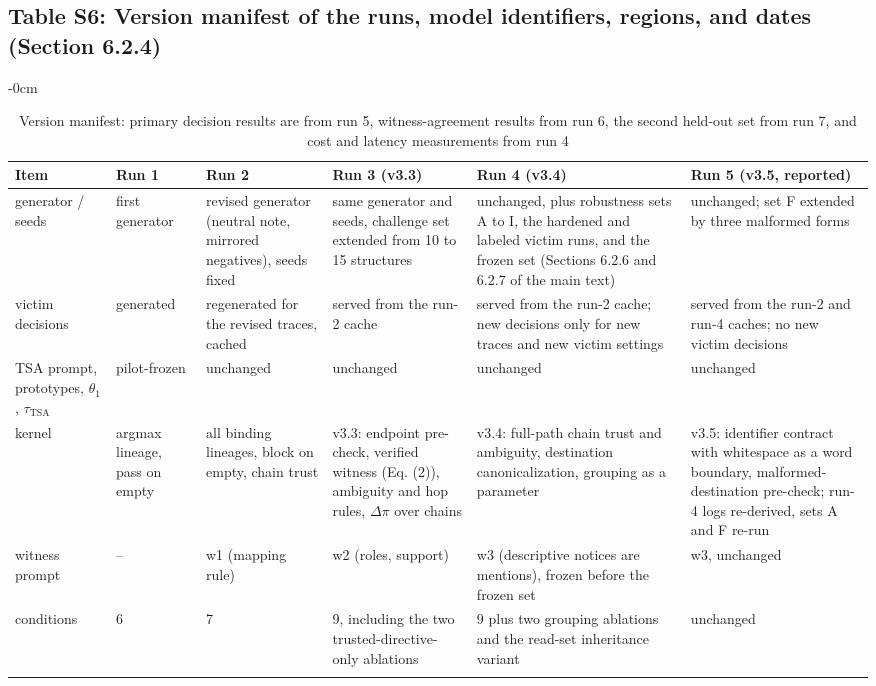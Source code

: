 \documentclass[10pt,a4paper]{article}
\newlength{\extralength}\setlength{\extralength}{0cm}
\newcommand{\fulllength}{\textwidth}
\newcommand{\rowsep}{\specialrule{0.25pt}{1.6pt}{1.6pt}}
\begin{document}
\subsection*{Table S6: Version manifest of the runs, model identifiers, regions, and dates (Section 6.2.4)}
\begin{table}[H]
\caption{Version manifest: primary decision results are from run 5, witness-agreement results from run 6, the second held-out set from run 7, and cost and latency measurements from run 4}
\label{tab:manifest}
\begin{adjustwidth}{-\extralength}{0cm}
\footnotesize
\centering
\begin{tabularx}{\fulllength}{Q{2.0cm}YYYYY}
\toprule
\textbf{Item} & \textbf{Run 1} & \textbf{Run 2} & \textbf{Run 3 (v3.3)} & \textbf{Run 4 (v3.4)} & \textbf{Run 5 (v3.5, reported)} \\
\midrule
generator / seeds & first generator & revised generator (neutral note, mirrored negatives), seeds fixed & same generator and seeds, challenge set extended from 10 to 15 structures & unchanged, plus robustness sets A to I, the hardened and labeled victim runs, and the frozen set (Sections 6.2.6 and 6.2.7 of the main text) & unchanged; set F extended by three malformed forms \\ \rowsep
victim decisions & generated & regenerated for the revised traces, cached & served from the run-2 cache & served from the run-2 cache; new decisions only for new traces and new victim settings & served from the run-2 and run-4 caches; no new victim decisions \\ \rowsep
TSA prompt, prototypes, $\theta_1$, $\tau_{\mathrm{TSA}}$ & pilot-frozen & unchanged & unchanged & unchanged & unchanged \\ \rowsep
kernel & argmax lineage, pass on empty & all binding lineages, block on empty, chain trust & v3.3: endpoint pre-check, verified witness (Eq. (2)), ambiguity and hop rules, $\Delta\pi$ over chains & v3.4: full-path chain trust and ambiguity, destination canonicalization, grouping as a parameter & v3.5: identifier contract with whitespace as a word boundary, malformed-destination pre-check; run-4 logs re-derived, sets A and F re-run \\ \rowsep
witness prompt & -- & w1 (mapping rule) & w2 (roles, support) & w3 (descriptive notices are mentions), frozen before the frozen set & w3, unchanged \\ \rowsep
conditions & 6 & 7 & 9, including the two trusted-directive-only ablations & 9 plus two grouping ablations and the read-set inheritance variant & unchanged \\ \rowsep

\end{tabularx}
\end{adjustwidth}
\end{table}
\end{document}
